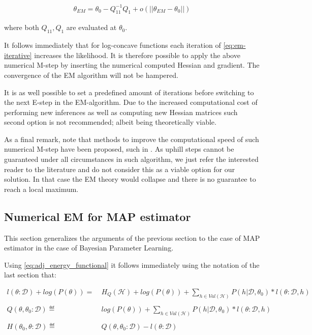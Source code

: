 \documentclass[11pt]{article}
\begin{document}
\begin{article}
\begin{align} 
 \theta_{EM}  = \theta_{0} - Q_{11}^{-1} Q_1 + o(||\theta_{EM} - \theta_{0}||) \label{eq:em-iterative}
\end{align}

where both \(Q_{11}, Q_{1}\) are evaluated at \(\theta_0\).

It follows immediately that for log-concave functions each
iteration of \ref{eq:em-iterative} increases the likelihood. It is
therefore possible to apply the above numerical M-step by inserting
the numerical computed Hessian and gradient. The convergence of the
EM algorithm will not be hampered.

It is as well possible to set a predefined amount of iterations
before switching to the next E-step in the EM-algorithm. Due to the
increased computational cost of performing new inferences as well
as computing new Hessian matrices such second option is not
recommended; albeit being theoretically viable.

As a final remark, note that methods to improve the computational
speed of such numerical M-step have been proposed, such in
\cite{Louis_1982}. As uphill steps cannot be guaranteed under all
circumstances in such algorithm, we just refer the interested
reader to the literature and do not consider this as a viable
option for our solution. In that case the EM theory would collapse
and there is no guarantee to reach a local maximum.

\subsection{Numerical EM for MAP estimator}
\label{sec:org0da9a49}

This section generalizes the arguments of the previous section to
the case of MAP estimator in the case of Bayesian Parameter
Learning.

Using \ref{eq:adj_energy_functional} it follows immediately using the
notation of the last section that:

\begin{align} \label{eq:likelihood_energy_map_iterative}
l (\theta: \mathcal{D}) + log(P(\theta)) =& \ H_Q (\mathcal{H}) + log(P(\theta)) + \sum_{h \in Val(\mathcal{H})} P(h | \mathcal{D}, \theta_0) * l (\theta: \mathcal{D}, h)\\
\nonumber\\
Q(\theta, \theta_0 : \mathcal{D}) \eqdef& \ log(P(\theta)) + \sum_{h \in Val(\mathcal{H})} P(h | \mathcal{D}, \theta_0) * l (\theta: \mathcal{D}, h)\\
\nonumber\\  
H(\theta_0, \theta: \mathcal{D}) \eqdef& \ Q(\theta, \theta_0 : \mathcal{D}) - l (\theta: \mathcal{D}) 
\end{align}


\end{article}
\end{document}
